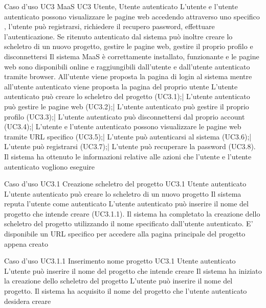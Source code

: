 \UCtitle
{Caso d'uso UC3}
{MaaS}
\UC
{UC3}
{Utente, Utente autenticato}
{L'utente e l'utente autenticato possono visualizzare le pagine web accedendo attraverso uno specifico , l'utente può registrarsi, richiedere il recupero password, effettuare l'autenticazione. Se ritenuto autenticato dal sistema può inoltre creare lo scheletro di un nuovo progetto, gestire le pagine web, gestire il proprio profilo e disconnettersi}
{Il sistema MaaS è correttamente installato, funzionante e le pagine web sono disponibili online e raggiungibili dall'utente e dall'utente autenticato tramite browser. All'utente viene proposta la pagina di login al sistema mentre all'utente autenticato viene proposta la pagina del proprio  utente}
\scenario
{L'utente autenticato può creare lo scheletro del progetto (UC3.1);|
L'utente autenticato può  gestire le pagine web (UC3.2);|
L'utente autenticato può  gestire il proprio profilo (UC3.3);|
L'utente autenticato può  disconnettersi dal proprio account (UC3.4);|
L'utente e l'utente autenticato possono visualizzare le pagine web tramite URL specifico (UC3.5);|
L'utente può autenticarsi al sistema (UC3.6);|
L'utente può registrarsi (UC3.7);|
L'utente può recuperare la password (UC3.8).
}
\post
{Il sistema ha ottenuto le informazioni relative alle azioni che l'utente e l'utente autenticato vogliono eseguire}


\UCtitle
{Caso d'uso UC3.1}
{Creazione scheletro del progetto}
\UC
{UC3.1}
{Utente autenticato}
{L'utente autenticato può creare lo scheletro di un nuovo progetto}
{Il sistema reputa l'utente come autenticato}
\scenario
{L'utente autenticato può inserire il nome del progetto che intende creare (UC3.1.1).}
\post
{Il sistema ha completato la creazione dello scheletro del progetto utilizzando il nome specificato dall'utente autenticato. E' disponibile un URL specifico per accedere alla pagina principale del progetto appena creato}

\UCtitle
{Caso d'uso UC3.1.1}
{Inserimento nome progetto}
\UC
{UC3.1}
{Utente autenticato}
{L'utente può inserire il nome del progetto che intende creare}
{Il sistema ha iniziato la creazione dello scheletro del progetto}
\scenario
{L'utente può inserire il nome del progetto.}
\post
{Il sistema ha acquisito il nome del progetto che l'utente autenticato desidera creare}

